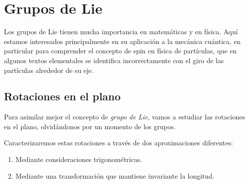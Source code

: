 %
%

\chapter{Grupos de Lie}
Los grupos de Lie tienen mucha importancia en matemáticas y en física.
Aquí estamos interesados principalmente en su aplicación a la mecánica
cuántica, en particular para comprender el concepto de spin en física de
partículas, que en algunos textos elementales se identifica incorrectamente
con el giro de las partículas alrededor de su eje.

\section{Rotaciones en el plano}
Para asimilar mejor el concepto de \emph{grupo de Lie}, vamos a
estudiar las rotaciones en el plano, olvidándonos por un momento de
los grupos.

Caracterizaremos estas rotaciones a través de dos aproximaciones diferentes:
\begin{enumerate}
\item Mediante consideraciones trigonométricas.
\item Mediante una transformación que mantiene invariante la longitud.
\end{enumerate}

